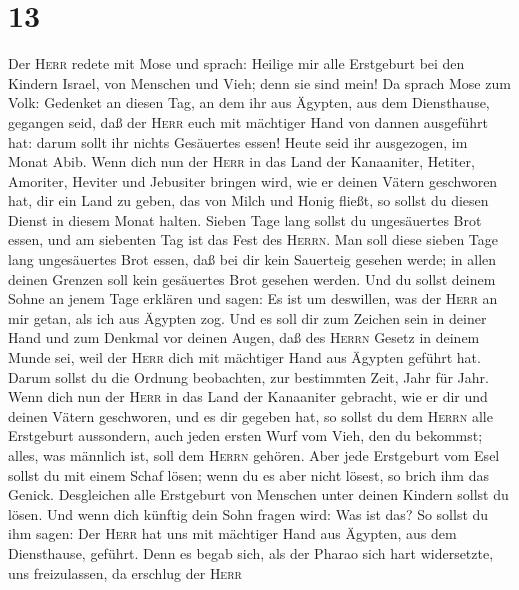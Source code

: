\hypertarget{section-12}{%
\section{13}\label{section-12}}

 Der \textsc{Herr} redete mit Mose und sprach:
 Heilige mir alle Erstgeburt bei den Kindern Israel, von
Menschen und Vieh; denn sie sind mein!  Da sprach Mose zum
Volk: Gedenket an diesen Tag, an dem ihr aus Ägypten, aus dem
Diensthause, gegangen seid, daß der \textsc{Herr} euch mit mächtiger
Hand von dannen ausgeführt hat: darum sollt ihr nichts Gesäuertes essen!
 Heute seid ihr ausgezogen, im Monat Abib. 
Wenn dich nun der \textsc{Herr} in das Land der Kanaaniter, Hetiter,
Amoriter, Heviter und Jebusiter bringen wird, wie er deinen Vätern
geschworen hat, dir ein Land zu geben, das von Milch und Honig fließt,
so sollst du diesen Dienst in diesem Monat halten.  Sieben
Tage lang sollst du ungesäuertes Brot essen, und am siebenten Tag ist
das Fest des \textsc{Herrn}.  Man soll diese sieben Tage
lang ungesäuertes Brot essen, daß bei dir kein Sauerteig gesehen werde;
in allen deinen Grenzen soll kein gesäuertes Brot gesehen werden.
 Und du sollst deinem Sohne an jenem Tage erklären und
sagen: Es ist um deswillen, was der \textsc{Herr} an mir getan, als ich
aus Ägypten zog.  Und es soll dir zum Zeichen sein in
deiner Hand und zum Denkmal vor deinen Augen, daß des \textsc{Herrn}
Gesetz in deinem Munde sei, weil der \textsc{Herr} dich mit mächtiger
Hand aus Ägypten geführt hat.  Darum sollst du die
Ordnung beobachten, zur bestimmten Zeit, Jahr für Jahr. 
Wenn dich nun der \textsc{Herr} in das Land der Kanaaniter gebracht, wie
er dir und deinen Vätern geschworen, und es dir gegeben hat,
 so sollst du dem \textsc{Herrn} alle Erstgeburt
aussondern, auch jeden ersten Wurf vom Vieh, den du bekommst; alles, was
männlich ist, soll dem \textsc{Herrn} gehören.  Aber jede
Erstgeburt vom Esel sollst du mit einem Schaf lösen; wenn du es aber
nicht lösest, so brich ihm das Genick. Desgleichen alle Erstgeburt von
Menschen unter deinen Kindern sollst du lösen.  Und wenn
dich künftig dein Sohn fragen wird: Was ist das? So sollst du ihm sagen:
Der \textsc{Herr} hat uns mit mächtiger Hand aus Ägypten, aus dem
Diensthause, geführt.  Denn es begab sich, als der Pharao
sich hart widersetzte, uns freizulassen, da erschlug der \textsc{Herr}
